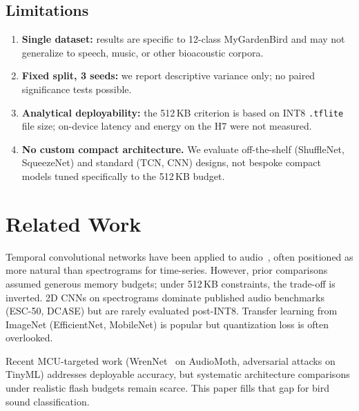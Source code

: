 \documentclass[conference]{IEEEtran}
\begin{document}
\subsection{Limitations}
\begin{enumerate}
  \item \textbf{Single dataset:} results are specific to 12-class MyGardenBird and may not generalize to speech, music, or other bioacoustic corpora.
  \item \textbf{Fixed split, 3 seeds:} we report descriptive variance only; no paired significance tests possible.
  \item \textbf{Analytical deployability:} the 512\,KB criterion is based on INT8 \texttt{.tflite} file size; on-device latency and energy on the H7 were not measured.
  \item \textbf{No custom compact architecture.} We evaluate off-the-shelf (ShuffleNet, SqueezeNet) and standard (TCN, CNN) designs, not bespoke compact models tuned specifically to the 512\,KB budget.
\end{enumerate}


\section{Related Work}

Temporal convolutional networks have been applied to audio~\cite{bai2018empirical, choi2019tcresnet, kim2021bcresnet}, often positioned as more natural than spectrograms for time-series. However, prior comparisons assumed generous memory budgets; under 512\,KB constraints, the trade-off is inverted. 2D CNNs on spectrograms dominate published audio benchmarks (ESC-50, DCASE) but are rarely evaluated post-INT8. Transfer learning from ImageNet (EfficientNet, MobileNet) is popular but quantization loss is often overlooked.

Recent MCU-targeted work (WrenNet~\cite{ciapponi2025wrennet} on AudioMoth, adversarial attacks on TinyML) addresses deployable accuracy, but systematic architecture comparisons under realistic flash budgets remain scarce. This paper fills that gap for bird sound classification.

\end{document}
